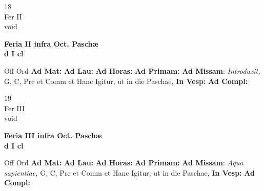 \documentclass[10pt, openany]{book}
\begin{document}
    \begin{center}
        \begin{minipage}{3.5in}
            \vspace{2em}
            \begin{minipage}{0.5in}
                {\Huge 18} \\
                {\normalsize Fer II} \\
                {\normalsize void}
            \end{minipage}
            \begin{minipage}{3.0in}
                \textbf{ \large Feria II infra Oct. Paschæ \\
                \textnormal{\normalsize d I cl}} \\ 
            \end{minipage}
            \begin{justify}Off Ord
                \textbf{Ad Mat: }
                \textbf{Ad Lau: }
                \textbf{Ad Horas: }
                \textbf{Ad Primam: }\textbf{Ad Missam}: \textit{Introduxit,} G, C, Pre et Comm et Hanc Igitur, ut in die Paschae,  
                \textbf{In Vesp: }
                \textbf{Ad Compl: }
            \end{justify}
        \end{minipage}
    \end{center}

    \begin{center}
        \begin{minipage}{3.5in}
            \vspace{2em}
            \begin{minipage}{0.5in}
                {\Huge 19} \\
                {\normalsize Fer III} \\
                {\normalsize void}
            \end{minipage}
            \begin{minipage}{3.0in}
                \textbf{ \large Feria III infra Oct. Paschæ \\
                \textnormal{\normalsize d I cl}} \\ 
            \end{minipage}
            \begin{justify}Off Ord
                \textbf{Ad Mat: }
                \textbf{Ad Lau: }
                \textbf{Ad Horas: }
                \textbf{Ad Primam: }\textbf{Ad Missam}: \textit{Aqua sapientiae,} G, C, Pre et Comm et Hanc Igitur, ut in die Paschae,  
                \textbf{In Vesp: }
                \textbf{Ad Compl: }
            \end{justify}
        \end{minipage}
    \end{center}
\end{document}
